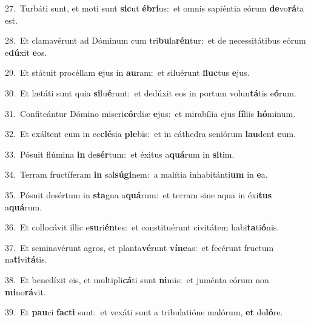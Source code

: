 {\numbfont\textcolor{\numbcolor}{27.}}~Turbáti sunt, et moti sunt \textbf{sic}\-ut \textbf{é}\-\textbf{bri}us:~\star et omnis sapiéntia eórum \textbf{de}\-vo\-\textbf{rá}\-ta est.\par
{\numbfont\textcolor{\numbcolor}{28.}}~Et clamavérunt ad Dóminum cum tri\-\textbf{bu}\-la\-\textbf{rén}\-tur:~\star et de necessitátibus eórum e\-\textbf{dú}\-xit \textbf{e}\-os.\par
{\numbfont\textcolor{\numbcolor}{29.}}~Et státuit procéllam \textbf{e}\-jus in \textbf{au}\-ram:~\star et siluérunt \textbf{fluc}\-tus \textbf{e}\-jus.\par
{\numbfont\textcolor{\numbcolor}{30.}}~Et lætáti sunt quia \textbf{si}\-lu\-\textbf{é}\-runt:~\star et dedúxit eos in portum volun\-\textbf{tá}\-tis e\-\textbf{ó}\-rum.\par
{\numbfont\textcolor{\numbcolor}{31.}}~Confiteántur Dómino miseri\-\textbf{cór}\-diæ \textbf{e}\-jus:~\star et mirabília ejus \textbf{fí}\-liis \textbf{hó}\-minum.\par
{\numbfont\textcolor{\numbcolor}{32.}}~Et exáltent eum in ec\-\textbf{clé}\-sia \textbf{ple}\-bis:~\star et in cáthedra seniórum \textbf{lau}\-dent \textbf{e}\-um.\par
{\numbfont\textcolor{\numbcolor}{33.}}~Pósuit flúmina \textbf{in} de\-\textbf{sér}\-tum:~\star et éxitus a\-\textbf{quá}\-rum in \textbf{si}\-tim.\par
{\numbfont\textcolor{\numbcolor}{34.}}~Terram fructíferam \textbf{in} sal\-\textbf{sú}\-\textbf{gi}nem:~\star a malítia inhabitánti\textbf{um} in \textbf{e}\-a.\par
{\numbfont\textcolor{\numbcolor}{35.}}~Pósuit desértum in \textbf{sta}\-gna a\-\textbf{quá}\-rum:~\star et terram sine aqua in éxi\textbf{tus} a\-\textbf{quá}\-rum.\par
{\numbfont\textcolor{\numbcolor}{36.}}~Et collocávit illic e\-\textbf{su}\-ri\-\textbf{én}\-tes:~\star et constituérunt civitátem habi\-\textbf{ta}\-ti\-\textbf{ó}\-nis.\par
{\numbfont\textcolor{\numbcolor}{37.}}~Et seminavérunt agros, et planta\-\textbf{vé}\-runt \textbf{ví}\-\textbf{ne}as:~\star et fecérunt fructum na\-\textbf{ti}\-vi\-\textbf{tá}\-tis.\par
{\numbfont\textcolor{\numbcolor}{38.}}~Et benedíxit eis, et multipli\-\textbf{cá}\-ti sunt \textbf{ni}\-mis:~\star et juménta eórum non \textbf{mi}\-no\-\textbf{rá}\-vit.\par
{\numbfont\textcolor{\numbcolor}{39.}}~Et \textbf{pau}\-ci \textbf{fac}\-\textbf{ti} sunt:~\star et vexáti sunt a tribulatióne malórum, \textbf{et} do\-\textbf{ló}\-re.\par
